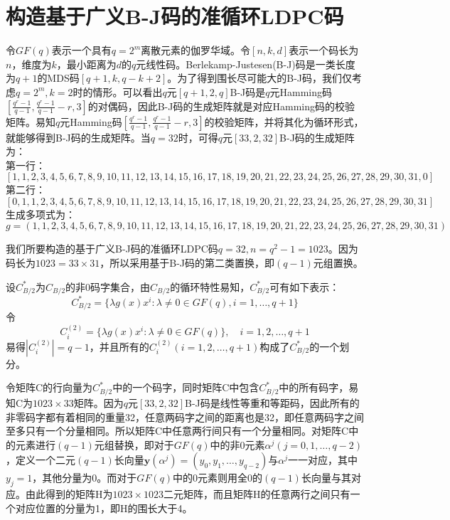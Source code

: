 \documentclass[lang=cn,11pt,a4paper,numbers]{elegantpaper}
\begin{document}
\section{构造基于广义B-J码的准循环LDPC码}
令$GF(q)$表示一个具有$q=2^m$离散元素的伽罗华域。令$[n,k,d]$表示一个码长为$n$，维度为$k$，最小距离为$d$的$q$元线性码。Berlekamp-Justesen(B-J)码是一类长度为$q+1$的MDS码$[q+1,k,q-k+2]$。为了得到围长尽可能大的B-J码，我们仅考虑$q=2^m,k=2$时的情形。可以看出$q$元$[q+1,2,q]$B-J码是$q$元Hamming码$[\frac{q^r-1}{q-1},\frac{q^r-1}{q-1}-r,3]$的对偶码，因此B-J码的生成矩阵就是对应Hamming码的校验矩阵。易知$q$元Hamming码$[\frac{q^r-1}{q-1},\frac{q^r-1}{q-1}-r,3]$的校验矩阵，并将其化为循环形式，就能够得到B-J码的生成矩阵。当$q=32$时，可得$q$元$[33,2,32]$B-J码的生成矩阵为：
\\第一行：$[1,1,2,3,4,5,6,7,8,9,10,11,12,13,14,15,16,17,18,19,20,21,22,23,24,25,26,27,28,29,30,31,0]$
\\第二行：$[0,1,1,2,3,4,5,6,7,8,9,10,11,12,13,14,15,16,17,18,19,20,21,22,23,24,25,26,27,28,29,30,31]$
\\生成多项式为：\\$g=(1,1,2,3,4,5,6,7,8,9,10,11,12,13,14,15,16,17,18,19,20,21,22,23,24,25,26,27,28,29,30,31)$

我们所要构造的基于广义B-J码的准循环LDPC码$q=32,n=q^2-1=1023$。因为码长为$1023=33 \times 31$，所以采用基于B-J码的第二类置换，即$(q-1)$元组置换。

设$C_{B/2}^{*}$为$C_{B/2}$的非0码字集合，由$C_{B/2}$的循环特性易知，$C_{B/2}^{*}$可有如下表示：
\begin{equation}
C_{B/2}^{*} = \{\lambda g(x)x^i: \lambda \neq 0 \in GF(q), i=1,\dots, q+1\}
\end{equation}
令
\begin{equation}
C_i^{(2)} = \{\lambda g(x)x^i: \lambda \neq 0 \in GF(q)\}, \quad i=1,2,\dots, q+1
\end{equation}
易得$|C_i^{(2)}|=q-1$，并且所有的$C_i^{(2)}(i=1,2,\dots,q+1)$构成了$C_{B/2}^{*}$的一个划分。

令矩阵C的行向量为$C_{B/2}^{*}$中的一个码字，同时矩阵C中包含$C_{B/2}^{*}$中的所有码字，易知C为$1023\times 33$矩阵。因为$q$元$[33,2,32]$B-J码是线性等重和等距码，因此所有的非零码字都有着相同的重量32，任意两码字之间的距离也是32，即任意两码字之间至多只有一个分量相同。所以矩阵C中任意两行间只有一个分量相同。对矩阵C中的元素进行$(q-1)$元组替换，即对于$GF(q)$中的非0元素$\alpha^j(j=0,1,\dots,q-2)$，定义一个二元$(q-1)$长向量$\mathbf{y}(\alpha^j)=(y_0,y_1,\dots,y_{q-2})$与$\alpha^j$一一对应，其中$y_j=1$，其他分量为0。而对于$GF(q)$中的0元素则用全0的$(q-1)$长向量与其对应。由此得到的矩阵H为$1023 \times 1023$二元矩阵，而且矩阵H的任意两行之间只有一个对应位置的分量为1，即H的围长大于4。
\end{document}
